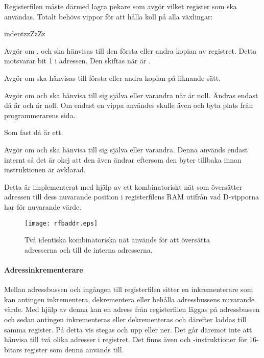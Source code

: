 \documentclass[main.tex]{subfiles}
\begin{document}
Registerfilen måste därmed lagra pekare som avgör vilket register som ska
användas. Totalt behövs vippor för att hålla koll på alla växlingar:
\begin{labeling}{indentzzZzZz}
\item[\mono{reg}]
    Avgör om ,  och  ska hänvisas till den första
    eller andra kopian av registret. Detta motsvarar bit 1 i adressen. Den
    skiftas när  är
    .
\item[\mono{af}]
    Avgör om  ska hänvisas till första eller andra kopian på liknande
    sätt.
\item[\mono{dehl0}]
    Avgör om  och  ska hänvisa till sig själva eller varandra
    när  är noll. Ändras endast då  är  och
     är noll. Om endast en vippa användes skulle även  och
     byta plats från programmerarens sida.
\item[\mono{dehl1}]
    Som  fast då  är ett.
\item[\mono{afwz}]
    Avgör om  och  ska hänvisa till sig själva eller
    varandra. Denna används endast internt så det är okej att den även ändrar
     eftersom den byter tillbaka innan instruktionen är avklarad.
\end{labeling}

Detta är implementerat med hjälp av ett kombinatoriskt nät som översätter
adressen till dess nuvarande position i registerfilens RAM utifrån vad
D-vipporna har för nuvarande värde.

\begin{figure}
    \center
    \texttt{[image: rfbaddr.eps]}
    \caption{Två identiska kombinatoriska nät används för att översätta
    adresserna  och  till de interna adresserna.}
    \label{fig:rfbaddr}
\end{figure}

\paragraph{Adressinkrementerare} %
Mellan adressbussen och ingången till registerfilen sitter en inkrementerare
som kan antingen inkrementera, dekrementera eller behålla adressbussens nuvarande
värde. Med hjälp av denna kan en adress från registerfilen läggas på
adressbussen och sedan antingen inkrementeras eller dekrementeras och därefter
laddas till samma register. På detta vis stegas  och  upp
eller ner. Det går däremot inte att hänvisa till två olika adresser i
registret. Det finns även  och -instruktioner för 16-bitars
register som denna används till.
\end{document}
